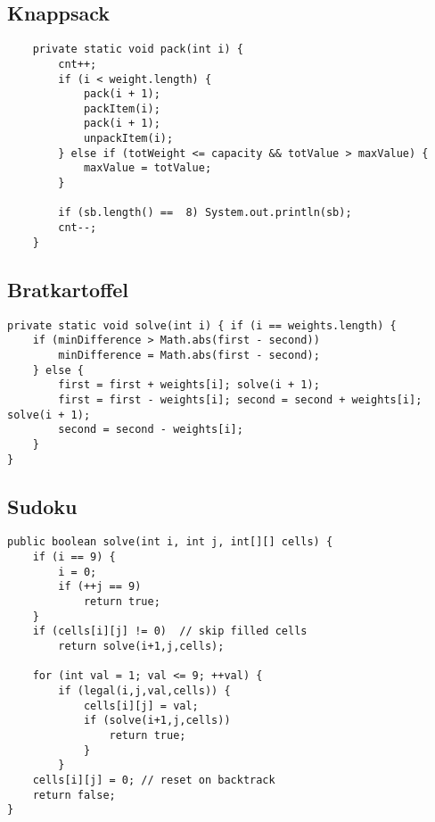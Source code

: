 \subsection*{Knappsack}
\begin{verbatim}
    private static void pack(int i) {
        cnt++;
        if (i < weight.length) {
            pack(i + 1);
            packItem(i);
            pack(i + 1);
            unpackItem(i);
        } else if (totWeight <= capacity && totValue > maxValue) {
            maxValue = totValue;
        }

        if (sb.length() ==  8) System.out.println(sb);
        cnt--;
    }
\end{verbatim}
\subsection*{Bratkartoffel}
\begin{verbatim}
private static void solve(int i) { if (i == weights.length) {
	if (minDifference > Math.abs(first - second)) 
		minDifference = Math.abs(first - second);
	} else {
		first = first + weights[i]; solve(i + 1);
		first = first - weights[i]; second = second + weights[i]; solve(i + 1);
		second = second - weights[i];
	}
}
\end{verbatim}
\subsection*{Sudoku}
\begin{verbatim}
public boolean solve(int i, int j, int[][] cells) {
	if (i == 9) {
		i = 0;
		if (++j == 9) 
			return true; 
	}
	if (cells[i][j] != 0)  // skip filled cells
		return solve(i+1,j,cells);
	
	for (int val = 1; val <= 9; ++val) {
	    if (legal(i,j,val,cells)) {  
			cells[i][j] = val;       
			if (solve(i+1,j,cells))  
		    	return true;
	    	}
		}
	cells[i][j] = 0; // reset on backtrack
	return false;
}
\end{verbatim}
